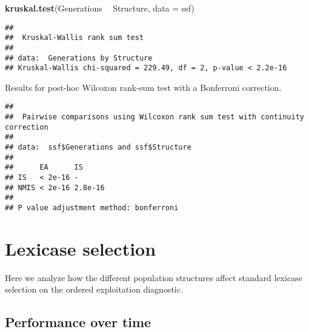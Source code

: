 \documentclass[]{book}
\newenvironment{Shaded}{\begin{snugshade}}{\end{snugshade}}
\newcommand{\DataTypeTok}[1]{\textcolor[rgb]{0.13,0.29,0.53}{#1}}
\newcommand{\KeywordTok}[1]{\textcolor[rgb]{0.13,0.29,0.53}{\textbf{#1}}}
\newcommand{\NormalTok}[1]{#1}
\newcommand{\OperatorTok}[1]{\textcolor[rgb]{0.81,0.36,0.00}{\textbf{#1}}}
\newcommand{\OtherTok}[1]{\textcolor[rgb]{0.56,0.35,0.01}{#1}}
\newcommand{\StringTok}[1]{\textcolor[rgb]{0.31,0.60,0.02}{#1}}
\begin{document}
\begin{Shaded}
\begin{Highlighting}[]
\KeywordTok{kruskal.test}\NormalTok{(Generations }\OperatorTok{~}\StringTok{ }\NormalTok{Structure, }\DataTypeTok{data =}\NormalTok{ ssf)}
\end{Highlighting}
\end{Shaded}

\begin{verbatim}
## 
##  Kruskal-Wallis rank sum test
## 
## data:  Generations by Structure
## Kruskal-Wallis chi-squared = 229.49, df = 2, p-value < 2.2e-16
\end{verbatim}

Results for post-hoc Wilcoxon rank-sum test with a Bonferroni correction.

\begin{Shaded}
\end{Shaded}

\begin{verbatim}
## 
##  Pairwise comparisons using Wilcoxon rank sum test with continuity correction 
## 
## data:  ssf$Generations and ssf$Structure 
## 
##      EA      IS     
## IS   < 2e-16 -      
## NMIS < 2e-16 2.8e-16
## 
## P value adjustment method: bonferroni
\end{verbatim}

\hypertarget{lexicase-selection-1}{%
\section{Lexicase selection}\label{lexicase-selection-1}}

Here we analyze how the different population structures affect standard lexicase selection on the ordered exploitation diagnostic.

\hypertarget{performance-over-time-5}{%
\subsection{Performance over time}\label{performance-over-time-5}}
\end{document}
